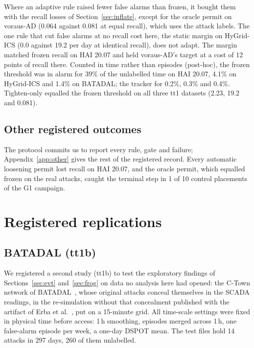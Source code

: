 \documentclass[sigconf]{acmart}
\begin{document}
Where an adaptive rule raised fewer false alarms than frozen, it bought them with the recall losses of Section~\ref{sec:inflate}, except for the oracle permit on voraus-AD (0.064 against 0.081 at equal recall), which uses the attack labels. The one rule that cut false alarms at no recall cost here, the static
margin on HyGrid-ICS (0.0 against 19.2 per day at identical recall), does not adapt. The margin
matched frozen recall on HAI 20.07 and held voraus-AD's target at a cost of 12 points of recall
there. Counted in time rather than episodes (post-hoc), the frozen threshold was in alarm for 39\% of
the unlabelled time on HAI 20.07, 4.1\% on HyGrid-ICS and 1.4\% on BATADAL; the tracker for 0.2\%, 0.3\%
and 0.4\%. Tighten-only equalled the frozen threshold on all three tt1 datasets (2.23, 19.2 and 0.081).

\subsection{Other registered outcomes}
\label{sec:other}

The protocol commits us to report every rule, gate and failure; Appendix~\ref{app:other} gives the rest
of the registered record. Every automatic loosening permit lost recall on HAI 20.07, and the oracle
permit, which equalled frozen on the real attacks, caught the terminal step in 1 of 10 control
placements of the G1 campaign.

\section{Registered replications}
\label{sec:replications}

\subsection{BATADAL (tt1b)}
\label{sec:batadal}

We registered a second study (tt1b) to test the exploratory findings of Sections~\ref{sec:evt}
and~\ref{sec:frog} on data no analysis here had opened: the C-Town network of
BATADAL~\cite{taormina2018batadal}, whose original attacks conceal themselves in the SCADA readings,
in the re-simulation without that concealment published with the artifact of Erba
et al.~\cite{erba2020concealment}, put on a 15-minute grid. All time-scale settings were fixed in
physical time before access: 1\,h smoothing, episodes merged across 1\,h, one false-alarm episode per
week, a one-day DSPOT mean. The test files hold 14 attacks in 297 days, 260 of them unlabelled.
\end{document}
